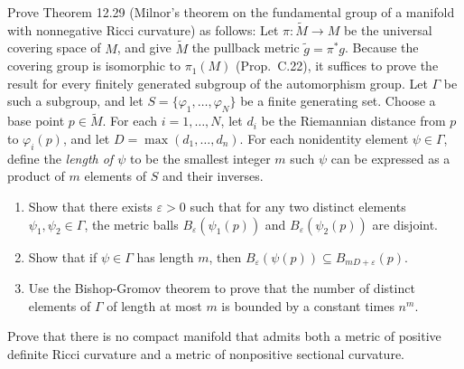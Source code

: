 \begin{exercise}\label{prob:milnor-fundamental-group}
Prove Theorem 12.29 (Milnor's theorem on the fundamental group of a manifold with nonnegative Ricci curvature) as follows: Let $\pi : \tilde{M} \to M$ be the universal covering space of $M$, and give $\tilde{M}$ the pullback metric $\tilde{g} = \pi^* g$.
Because the covering group is isomorphic to $\pi_1(M)$ (Prop.\ C.22), it suffices to prove the result for every finitely generated subgroup of the automorphism group. Let $\Gamma$ be such a subgroup, and let $S = \{\varphi_1, \ldots, \varphi_N\}$ be a finite generating set. Choose a base point $p \in \tilde{M}$. For each $i = 1, \ldots, N$, let $d_i$ be the Riemannian distance from $p$ to $\varphi_i(p)$, and let $D = \max(d_1, \ldots, d_n)$.
For each nonidentity element $\psi \in \Gamma$, define the \emph{length of $\psi$} to be the smallest integer $m$ such $\psi$ can be expressed as a product of $m$ elements of $S$ and their inverses.

\begin{enumerate}[label=(\alph*)]
\item Show that there exists $\varepsilon > 0$ such that for any two distinct elements $\psi_1, \psi_2 \in \Gamma$, the metric balls $B_\varepsilon(\psi_1(p))$ and $B_\varepsilon(\psi_2(p))$ are disjoint.
\item Show that if $\psi \in \Gamma$ has length $m$, then $B_\varepsilon(\psi(p)) \subseteq B_{mD+\varepsilon}(p)$.
\item Use the Bishop-Gromov theorem to prove that the number of distinct elements of $\Gamma$ of length at most $m$ is bounded by a constant times $n^m$.
\end{enumerate}
\end{exercise}

\begin{exercise}\label{prob:no-positive-negative-ricci}
Prove that there is no compact manifold that admits both a metric of positive definite Ricci curvature and a metric of nonpositive sectional curvature.
\end{exercise}

